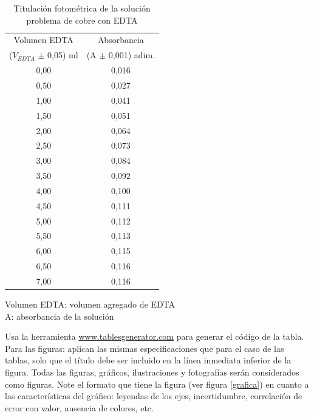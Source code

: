 \documentclass[12pt,letterpaper,twocolumn,twoside]{article}
\begin{document}
\begin{table}[htb]
\centering
\footnotesize
\caption{Titulación fotométrica de la solución problema de cobre con EDTA}
\label{tab:tabla1}
\begin{tabular}{c|c}
Volumen EDTA                & Absorbancia           \\
($V_{EDTA}$ $\pm$  0,05) ml & (A $\pm$ 0,001) adim. \\ \hline
0,00                        & 0,016                 \\
0,50                        & 0,027                 \\
1,00                        & 0,041                 \\
1,50                        & 0,051                 \\
2,00                        & 0,064                 \\
2,50                        & 0,073                 \\
3,00                        & 0,084                 \\
3,50                        & 0,092                 \\
4,00                        & 0,100                 \\
4,50                        & 0,111                 \\
5,00                        & 0,112                 \\
5,50                        & 0,113                 \\
6,00                        & 0,115                 \\
6,50                        & 0,116                 \\
7,00                        & 0,116 \\\hline               
\end{tabular}
\vspace{1mm} %

\raggedright
Volumen EDTA: volumen agregado de EDTA\\
A: absorbancia de la solución
\end{table}

Usa la herramienta \url{www.tablesgenerator.com} para generar el código de la tabla.
Para las figuras: aplican las mismas especificaciones que para el caso de las tablas, solo que el título debe ser incluido en la línea inmediata inferior de la figura. Todas las figuras, gráficos, ilustraciones y fotografías serán considerados como figuras. Note el formato que tiene la figura (ver figura \ref{grafica}) en cuanto a las características del gráfico: leyendas de los ejes, incertidumbre, correlación de error con valor, ausencia de colores, etc.
\end{document}
